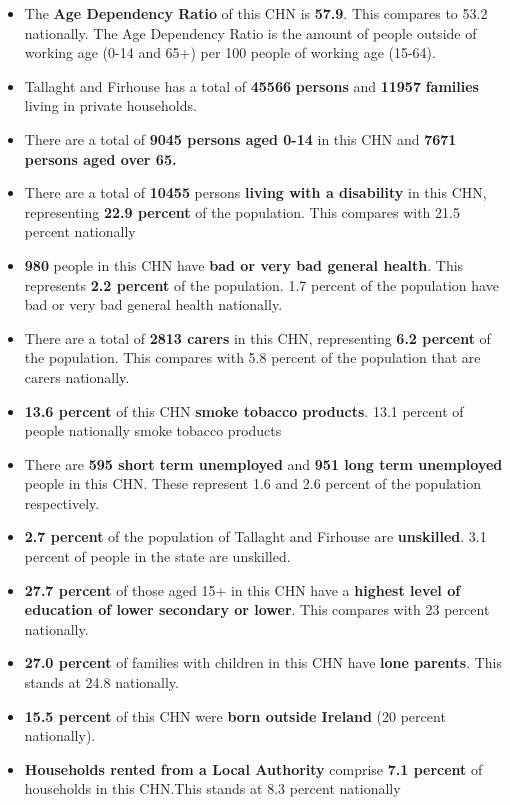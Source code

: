 \documentclass{article}
\begin{document}
\begin{itemize}

\item The \textbf{Age Dependency Ratio} of this CHN is  \textbf{57.9}. This compares to 53.2 nationally. The Age Dependency Ratio is the amount of people outside of working age (0-14 and 65+) per 100 people of working age (15-64). 

\item Tallaght and Firhouse has a total of \textbf{\num{45566}} \textbf{persons} and  \textbf{\num{11957}} \textbf{families} living in private households.

\item There are a total of \textbf{\num{9045} persons aged 0-14} in this CHN and \textbf{\num{7671} persons aged over 65.} 

\item There are a total of \textbf{\num{10455}} persons \textbf{living with a disability} in this CHN, representing \textbf{22.9 percent} of the population. This compares with  21.5 percent nationally

\item \textbf{\num{980}} people in this CHN have \textbf{bad or very bad general health}. This represents \textbf{2.2 percent} of the population. 1.7 percent of the population have bad or very bad general health nationally. 

\item There are a total of \textbf{\num{2813} carers} in this CHN, representing \textbf{6.2 percent} of the population. This compares with 5.8 percent of the population that are carers nationally. 

\item \textbf{13.6 percent} of this CHN \textbf{smoke tobacco products}. 13.1 percent of people nationally smoke tobacco products

\item There are \textbf{\num{595} short term unemployed} and \textbf{\num{951} long term unemployed} people in this CHN. These represent 1.6 and 2.6 percent of the population respectively.

\item  \textbf{2.7 percent} of the population of Tallaght and Firhouse are \textbf{unskilled}. 3.1 percent of people in the state are unskilled.

\item \textbf{27.7 percent} of those aged 15+ in this CHN have a \textbf{highest level of education of lower secondary or lower}. This compares with 23 percent nationally. 

\item \textbf{27.0 percent} of families with children in this CHN have \textbf{lone parents}. This stands at 24.8 nationally.

\item \textbf{15.5 percent} of this CHN were \textbf{born outside Ireland} (20 percent nationally).

\item \textbf{Households rented from a Local Authority} comprise \textbf{7.1 percent} of households in this CHN.This stands at 8.3 percent nationally

\end{itemize}
\end{document}
